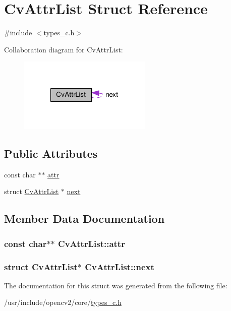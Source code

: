 \hypertarget{structCvAttrList}{\section{Cv\-Attr\-List Struct Reference}
\label{structCvAttrList}
}


{\ttfamily \#include $<$types\-\_\-c.\-h$>$}



Collaboration diagram for Cv\-Attr\-List\-:\nopagebreak
\begin{figure}[H]
\begin{center}
\leavevmode
\includegraphics[width=180pt]{structCvAttrList__coll__graph}
\end{center}
\end{figure}
\subsection*{Public Attributes}
\begin{DoxyCompactItemize}
\item 
const char $\ast$$\ast$ \hyperlink{structCvAttrList_a6f1c7bf36d46bb57721a4dedbcb7c8d3}{attr}
\item 
struct \hyperlink{structCvAttrList}{Cv\-Attr\-List} $\ast$ \hyperlink{structCvAttrList_a6e5fd12be3afc5cb81a083f6aaba32cc}{next}
\end{DoxyCompactItemize}


\subsection{Member Data Documentation}
\hypertarget{structCvAttrList_a6f1c7bf36d46bb57721a4dedbcb7c8d3}{
\subsubsection[{attr}]{\setlength{\rightskip}{0pt plus 5cm}const char$\ast$$\ast$ Cv\-Attr\-List\-::attr}}\label{structCvAttrList_a6f1c7bf36d46bb57721a4dedbcb7c8d3}
\hypertarget{structCvAttrList_a6e5fd12be3afc5cb81a083f6aaba32cc}{
\subsubsection[{next}]{\setlength{\rightskip}{0pt plus 5cm}struct {\bf Cv\-Attr\-List}$\ast$ Cv\-Attr\-List\-::next}}\label{structCvAttrList_a6e5fd12be3afc5cb81a083f6aaba32cc}


The documentation for this struct was generated from the following file\-:\begin{DoxyCompactItemize}
\item 
/usr/include/opencv2/core/\hyperlink{core_2types__c_8h}{types\-\_\-c.\-h}\end{DoxyCompactItemize}
